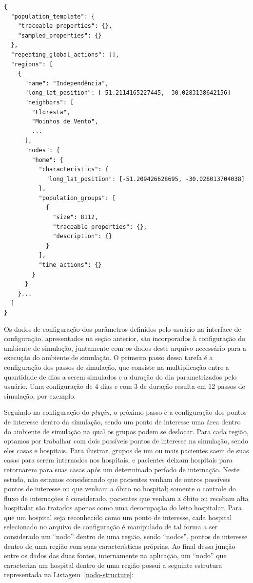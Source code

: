 \begin{listing}
\begin{verbatim}
{
  "population_template": {
    "traceable_properties": {},
    "sampled_properties": {}
  },
  "repeating_global_actions": [],
  "regions": [
    {
      "name": "Independência",
      "long_lat_position": [-51.2114165227445, -30.0283138642156]
      "neighbors": [
        "Floresta",
        "Moinhos de Vento",
        ...
      ],
      "nodes": {
        "home": {
          "characteristics": {
            "long_lat_position": [-51.209426628695, -30.028013704038]
          },
          "population_groups": [
            {
              "size": 8112,
              "traceable_properties": {},
              "description": {}
            }
          ],
          "time_actions": {}
        }
      }
    }...
  ]
}

\end{verbatim}
\caption{Exemplo de arquivo de configuração para execução do \textit{framework} LODUS.} 
\label{input-file}
\end{listing}

Os dados de configuração dos parâmetros definidos pelo usuário na interface de configuração, apresentados na seção anterior, são incorporados à configuração do ambiente de simulação, juntamente com os dados deste arquivo necessário para a execução do ambiente de simulação. O primeiro passo dessa tarefa é a configuração dos passos de simulação, que consiste na multiplicação entre a quantidade de dias a serem simulados e a duração do dia parametrizados pelo usuário. Uma configuração de 4 dias e com 3 de duração resulta em 12 passos de simulação, por exemplo.

Seguindo na configuração do \textit{plugin}, o próximo passo é a configuração dos pontos de interesse dentro da simulação, sendo um ponto de interesse uma área dentro do ambiente de simulação na qual os grupos podem se deslocar. Para cada região, optamos por trabalhar com dois possíveis pontos de interesse na simulação, sendo eles casas e hospitais. Para ilustrar, grupos de um ou mais pacientes saem de suas casas para serem internados nos hospitais, e pacientes deixam hospitais para retornarem para suas casas após um determinado período de internação. Neste estudo, não estamos considerando que pacientes venham de outros possíveis pontos de interesse ou que venham a óbito no hospital; somente o controle do fluxo de internações é considerado, pacientes que venham a óbito ou recebam alta hospitalar são tratados apenas como uma desocupação do leito hospitalar. Para que um hospital seja reconhecido como um ponto de interesse, cada hospital selecionado no arquivo de configuração é manipulado de tal forma a ser considerado um ``nodo'' dentro de uma região, sendo ``nodos'', pontos de interesse dentro de uma região com suas características próprias. Ao final dessa junção entre os dados das duas fontes, internamente na aplicação, um ``nodo'' que caracteriza um hospital dentro de uma região possui a seguinte estrutura representada na Listagem~\ref{nodo-structure}:

